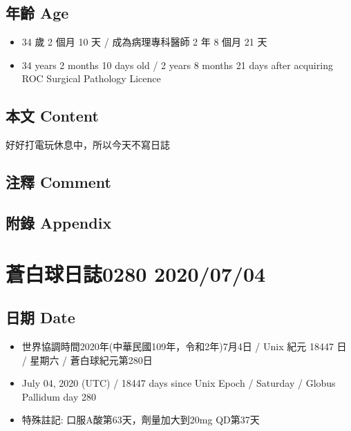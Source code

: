 \documentclass[a5paper, 11pt
]{book}
\providecommand{\tightlist}{%
  \setlength{\itemsep}{0pt}\setlength{\parskip}{0pt}}
\begin{document}
\hypertarget{ux5e74ux9f61-age-28}{%
\subsection{年齡 Age}\label{ux5e74ux9f61-age-28}}

\begin{itemize}
\tightlist
\item
  34 歲 2 個月 10 天 / 成為病理專科醫師 2 年 8 個月 21 天
\item
  34 years 2 months 10 days old / 2 years 8 months 21 days after
  acquiring ROC Surgical Pathology Licence
\end{itemize}

\hypertarget{ux672cux6587-content-28}{%
\subsection{本文 Content}\label{ux672cux6587-content-28}}

好好打電玩休息中，所以今天不寫日誌

\hypertarget{ux6ce8ux91cb-comment-28}{%
\subsection{注釋 Comment}\label{ux6ce8ux91cb-comment-28}}

\hypertarget{ux9644ux9304-appendix-28}{%
\subsection{附錄 Appendix}\label{ux9644ux9304-appendix-28}}

\hypertarget{ux84bcux767dux7403ux65e5ux8a8c0280-20200704}{%
\section{蒼白球日誌0280
2020/07/04}\label{ux84bcux767dux7403ux65e5ux8a8c0280-20200704}}

\hypertarget{ux65e5ux671f-date-29}{%
\subsection{日期 Date}\label{ux65e5ux671f-date-29}}

\begin{itemize}
\tightlist
\item
  世界協調時間2020年(中華民國109年，令和2年)7月4日 / Unix 紀元 18447 日
  / 星期六 / 蒼白球紀元第280日
\item
  July 04, 2020 (UTC) / 18447 days since Unix Epoch / Saturday / Globus
  Pallidum day 280
\item
  特殊註記: 口服A酸第63天，劑量加大到20mg QD第37天
\end{itemize}
\end{document}
